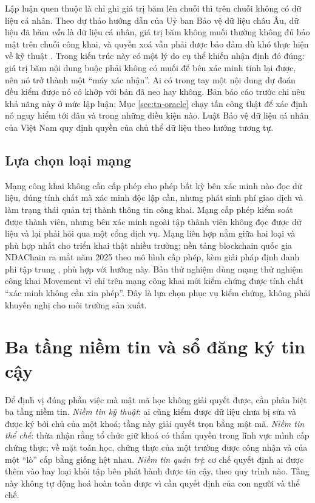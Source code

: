 Lập luận quen thuộc là chỉ ghi giá trị băm lên chuỗi thì trên chuỗi không có dữ liệu cá nhân. Theo dự thảo hướng dẫn của Uỷ ban Bảo vệ dữ liệu châu Âu, dữ liệu đã băm \emph{vẫn} là dữ liệu cá nhân, giá trị băm không muối thường không đủ bảo mật trên chuỗi công khai, và quyền xoá vẫn phải được bảo đảm dù khó thực hiện về kỹ thuật \cite{EDPB2025}. Trong kiến trúc này có một lý do cụ thể khiến nhận định đó đúng: giá trị băm nội dung buộc phải không có muối để bên xác minh tính lại được, nên nó trở thành một ``máy xác nhận''. Ai có trong tay một nội dung dự đoán đều kiểm được nó có khớp với bản đã neo hay không. Bản báo cáo trước chỉ nêu khả năng này ở mức lập luận; Mục \ref{sec:tn-oracle} chạy tấn công thật để xác định nó nguy hiểm tới đâu và trong những điều kiện nào. Luật Bảo vệ dữ liệu cá nhân của Việt Nam \cite{LuatBVDLCN2025} quy định quyền của chủ thể dữ liệu theo hướng tương tự.

\subsection{Lựa chọn loại mạng}

Mạng công khai không cần cấp phép cho phép bất kỳ bên xác minh nào đọc dữ liệu, đúng tính chất mà xác minh độc lập cần, nhưng phát sinh phí giao dịch và làm trạng thái quản trị thành thông tin công khai. Mạng cấp phép \cite{Androulaki2018} kiểm soát được thành viên, nhưng bên xác minh ngoài tập thành viên không đọc được dữ liệu và lại phải hỏi qua một cổng dịch vụ. Mạng liên hợp nằm giữa hai loại và phù hợp nhất cho triển khai thật nhiều trường; nền tảng blockchain quốc gia NDAChain ra mắt năm 2025 theo mô hình cấp phép, kèm giải pháp định danh phi tập trung \cite{NDAChain2025}, phù hợp với hướng này. Bản thử nghiệm dùng mạng thử nghiệm công khai Movement \cite{Movement2024} vì chỉ trên mạng công khai mới kiểm chứng được tính chất ``xác minh không cần xin phép''. Đây là lựa chọn phục vụ kiểm chứng, không phải khuyến nghị cho môi trường sản xuất.

\section{Ba tầng niềm tin và sổ đăng ký tin cậy}
\label{sec:ba-tang}

Để định vị đúng phần việc mà mật mã học không giải quyết được, cần phân biệt ba tầng niềm tin. \textit{Niềm tin kỹ thuật}: ai cũng kiểm được dữ liệu chưa bị sửa và được ký bởi chủ của một khoá; tầng này giải quyết trọn bằng mật mã. \textit{Niềm tin thể chế}: thừa nhận rằng tổ chức giữ khoá có thẩm quyền trong lĩnh vực mình cấp chứng thực; về mặt toán học, chứng thực của một trường được công nhận và của một ``lò'' cấp bằng giống hệt nhau. \textit{Niềm tin quản trị}: cơ chế quyết định ai được thêm vào hay loại khỏi tập bên phát hành được tin cậy, theo quy trình nào. Tầng này không tự động hoá hoàn toàn được vì cần quyết định của con người và thể chế.

